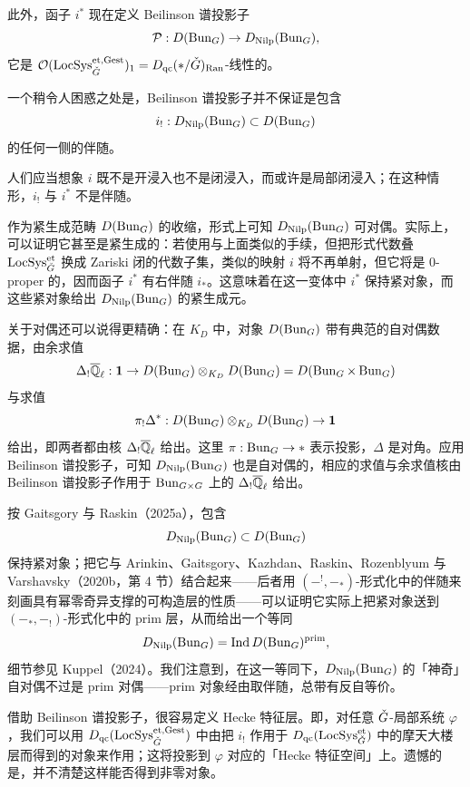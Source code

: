 此外，函子 $i^{*}$ 现在定义 Beilinson 谱投影子
\[ \mathcal{P}:D(\operatorname{Bun}_G)\to D_{\mathrm{Nilp}}(\operatorname{Bun}_G), \]
它是 $\mathcal{O}(\operatorname{LocSys}^{\mathrm{et},\mathrm{Gest}}_{\check{G}})_{1}=D_{\mathrm{qc}}(*/\check{G})_{\mathrm{Ran}}$-线性的。

\begin{remark}
一个稍令人困惑之处是，Beilinson 谱投影子并不保证是包含
\[ i_{!}:D_{\mathrm{Nilp}}(\operatorname{Bun}_G)\subset D(\operatorname{Bun}_G) \]
的任何一侧的伴随。

人们应当想象 $i$ 既不是开浸入也不是闭浸入，而或许是局部闭浸入；在这种情形，$i_{!}$ 与 $i^{*}$ 不是伴随。
\end{remark}

作为紧生成范畴 $D(\operatorname{Bun}_G)$ 的收缩，形式上可知 $D_{\mathrm{Nilp}}(\operatorname{Bun}_G)$ 可对偶。实际上，可以证明它甚至是紧生成的：若使用与上面类似的手续，但把形式代数叠 $\operatorname{LocSys}^{\mathrm{et}}_{\check{G}}$ 换成 Zariski 闭的代数子集，类似的映射 $i$ 将不再单射，但它将是 $0$-proper 的，因而函子 $i^{*}$ 有右伴随 $i_{*}$。这意味着在这一变体中 $i^{*}$ 保持紧对象，而这些紧对象给出 $D_{\mathrm{Nilp}}(\operatorname{Bun}_G)$ 的紧生成元。

关于对偶还可以说得更精确：在 $K_D$ 中，对象 $D(\operatorname{Bun}_G)$ 带有典范的自对偶数据，由余求值
\[ \Delta_{!}\overline{\mathbb{Q}}_{\ell}:\mathbf{1}\to D(\operatorname{Bun}_G)\otimes_{K_D}D(\operatorname{Bun}_G)=D(\operatorname{Bun}_G\times\operatorname{Bun}_G) \]
与求值
\[ \pi_{!}\Delta^{*}:D(\operatorname{Bun}_G)\otimes_{K_D}D(\operatorname{Bun}_G)\to\mathbf{1} \]
给出，即两者都由核 $\Delta_{!}\overline{\mathbb{Q}}_{\ell}$ 给出。这里 $\pi:\operatorname{Bun}_G\to*$ 表示投影，$\Delta$ 是对角。应用 Beilinson 谱投影子，可知 $D_{\mathrm{Nilp}}(\operatorname{Bun}_G)$ 也是自对偶的，相应的求值与余求值核由 Beilinson 谱投影子作用于 $\operatorname{Bun}_{G\times G}$ 上的 $\Delta_{!}\overline{\mathbb{Q}}_{\ell}$ 给出。

按 Gaitsgory 与 Raskin（2025a），包含
\[ D_{\mathrm{Nilp}}(\operatorname{Bun}_G)\subset D(\operatorname{Bun}_G) \]
保持紧对象；把它与 Arinkin、Gaitsgory、Kazhdan、Raskin、Rozenblyum 与 Varshavsky（2020b，第 4 节）结合起来——后者用 $(-^{!},-_{*})$-形式化中的伴随来刻画具有幂零奇异支撑的可构造层的性质——可以证明它实际上把紧对象送到 $(-_{*},-_{!})$-形式化中的 prim 层，从而给出一个等同
\[ D_{\mathrm{Nilp}}(\operatorname{Bun}_G)=\operatorname{Ind} D(\operatorname{Bun}_G)^{\mathrm{prim}}, \]
细节参见 Kuppel（2024）。我们注意到，在这一等同下，$D_{\mathrm{Nilp}}(\operatorname{Bun}_G)$ 的「神奇」自对偶不过是 prim 对偶——prim 对象经由取伴随，总带有反自等价。

借助 Beilinson 谱投影子，很容易定义 Hecke 特征层。即，对任意 $\check{G}$-局部系统 $\varphi$，我们可以用 $D_{\mathrm{qc}}(\operatorname{LocSys}^{\mathrm{et},\mathrm{Gest}}_{\check{G}})$ 中由把 $i_{!}$ 作用于 $D_{\mathrm{qc}}(\operatorname{LocSys}^{\mathrm{et}}_{\check{G}})$ 中的摩天大楼层而得到的对象来作用；这将投影到 $\varphi$ 对应的「Hecke 特征空间」上。遗憾的是，并不清楚这样能否得到非零对象。
